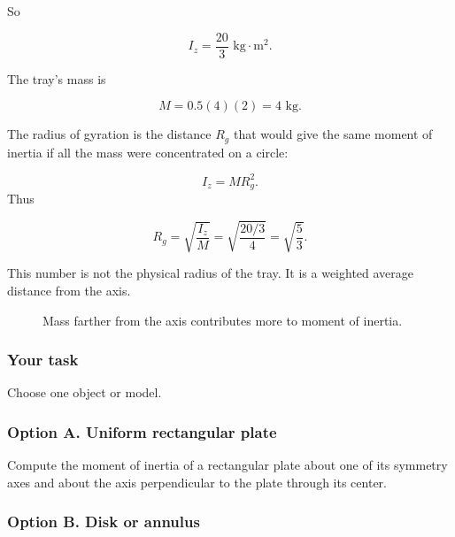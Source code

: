 So

\[
\boxed{
    I_z=\frac{20}{3}\text{ kg}\cdot\text{m}^2.
}
\]

The tray's mass is

\[
    M=0.5(4)(2)=4\text{ kg}.
\]

The radius of gyration is the distance \(R_g\) that would give the same moment of
inertia if all the mass were concentrated on a circle:

\[
    I_z=MR_g^2.
\]
Thus

\[
    R_g=\sqrt{\frac{I_z}{M}}
    =
    \sqrt{\frac{20/3}{4}}
    =
    \sqrt{\frac53}.
\]

This number is not the physical radius of the tray.  It is a weighted average distance
from the axis.

\begin{figure}[h]
\centering
{}
\caption{Mass farther from the axis contributes more to moment of inertia.}
\end{figure}

\subsubsection*{Your task}

Choose one object or model.

\subsubsection*{Option A. Uniform rectangular plate}

Compute the moment of inertia of a rectangular plate about one of its symmetry axes
and about the axis perpendicular to the plate through its center.

\subsubsection*{Option B. Disk or annulus}

